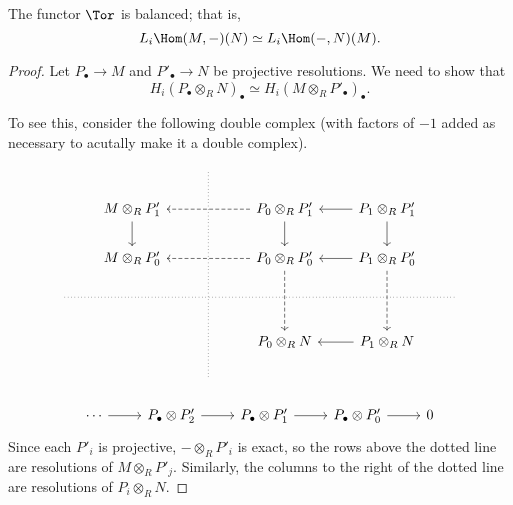 \documentclass[main.tex]{subfiles}
\begin{document}
\begin{proposition}
  \label{prop:tor_balanced}
  The functor $\Tor$ is balanced; that is,
  \begin{equation*}
    L_{i} \Hom(M, -)(N) \simeq L_{i} \Hom(-, N)(M).
  \end{equation*}
\end{proposition}
\begin{proof}
  Let $P_{\bullet} \to M$ and $P'_{\bullet} \to N$ be projective resolutions. We need to show that
  \begin{equation*}
    H_{i}(P_{\bullet} \otimes_{R} N)_{\bullet} \simeq H_{i}(M \otimes_{R} P'_{\bullet})_{\bullet}.
  \end{equation*}

  To see this, consider the following double complex (with factors of $-1$ added as necessary to acutally make it a double complex).
  \begin{equation*}
    \begin{tikzcd}
      && \
      \arrow[ddddd, no head, dotted]
      \\
      & M \otimes_{R} P'_{1}
      \arrow[d]
      && P_{0} \otimes_{R} P'_{1}
      \arrow[ll, dashed]
      \arrow[d]
      & P_{1} \otimes_{R} P'_{1}
      \arrow[l]
      \arrow[d]
      \\
      & M \otimes_{R} P'_{0}
      && P_{0} \otimes_{R} P'_{0}
      \arrow[ll, dashed]
      \arrow[dd, dashed]
      & P_{1} \otimes_{R} P'_{0}
      \arrow[l]
      \arrow[dd, dashed]
      \\
      \
      \arrow[rrrrr, dotted, no head]
      &&&&& \
      \\
      &&& P_{0} \otimes_{R} N
      & P_{1} \otimes_{R} N
      \arrow[l]
      \\
      && \
    \end{tikzcd}
  \end{equation*}

  \begin{equation*}
    \begin{tikzcd}
      \cdots
      \arrow[r]
      & P_{\bullet} \otimes P'_{2}
      \arrow[r]
      & P_{\bullet} \otimes P'_{1}
      \arrow[r]
      & P_{\bullet} \otimes P'_{0}
      \arrow[r]
      & 0
    \end{tikzcd}
  \end{equation*}
  Since each $P'_{i}$ is projective, $- \otimes_{R} P'_{i}$ is exact, so the rows above the dotted line are resolutions of $M \otimes_{R} P'_{j}$. Similarly, the columns to the right of the dotted line are resolutions of $P_{i} \otimes_{R} N$.


\end{proof}
\end{document}
